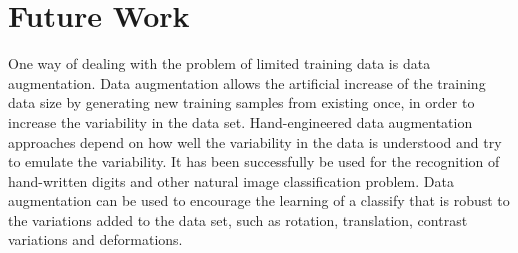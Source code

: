 \section{Future Work}


One way of dealing with the problem of limited training data is data
augmentation. Data augmentation allows the artificial increase of the training
data size by generating new training samples from existing once, in order to
increase the variability in the data set. Hand-engineered data augmentation
approaches depend on how well the variability in the data is understood and try
to emulate the variability. It has been successfully be used for the recognition
of hand-written digits and other natural image classification problem. Data
augmentation can be used to encourage the learning of a classify that is robust
to the variations added to the data set, such as rotation, translation, contrast
variations and deformations.

